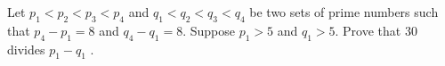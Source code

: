 \item Let $p_1 < p_2 < p_3 < p_4$ and $q_1 < q_2 < q_3 < q_4$ be two sets of prime numbers such that $p_4 - p_1 = 8$ and $q_4 - q_1 = 8$. Suppose $p_1 > 5$ and $q_1 > 5$. Prove that 30 divides $p_1 - q_1$ .

















